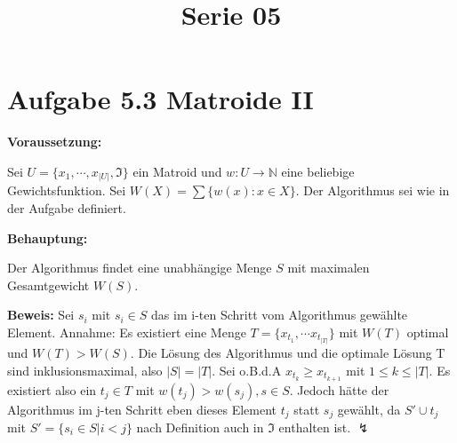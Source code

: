  
\title{Serie 05}

 

\section*{Aufgabe 5.3 Matroide II}

\textbf{Voraussetzung: }

Sei $U=\{x_1, \cdots, x_{|U|}, \mathfrak{I}\}$ ein Matroid und $w: U \rightarrow \mathbb{N}$ eine beliebige Gewichtsfunktion. Sei $W(X) = \sum\{w(x) : x \in X\}$. Der Algorithmus sei wie in der Aufgabe definiert.

\noindent
\textbf{Behauptung: } 

Der Algorithmus findet eine unabhängige Menge $S$ mit maximalen Gesamtgewicht $W(S)$.

\noindent
\textbf{Beweis: }
Sei $s_i$ mit $s_i \in S$ das im i-ten Schritt vom Algorithmus gewählte Element.
Annahme: Es existiert eine Menge $T = \{x_{t_1}, \cdots x_{t_{|T|}}\}$ mit $W(T)$ optimal und $W(T) > W(S)$. 
Die Lösung des Algorithmus und die optimale Lösung T sind inklusionsmaximal, also $|S| = |T|$. Sei o.B.d.A $x_{t_k} \geq x_{t_{k+1}}$ mit $ 1 \leq k \leq |T|$. Es existiert also ein $t_j \in T$ mit $w(t_j) > w(s_j), s \in S$. Jedoch hätte der Algorithmus im j-ten Schritt eben dieses Element $t_j$ statt $s_j$ gewählt, da $S' \cup t_j$ mit $S' = \{s_i \in S | i < j\}$ nach Definition auch in $\mathfrak{I}$ enthalten ist. $\lightning$



